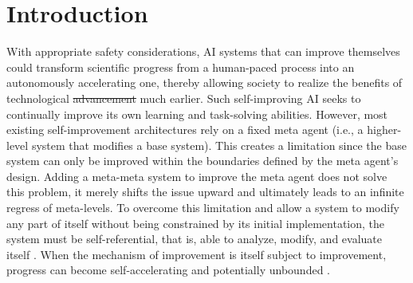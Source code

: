 \documentclass[]{fairmeta}
\title{{\ha}}
\author[1,2\dagger]{Jenny Zhang}
\author[3\dagger]{Bingchen Zhao}
\author[4,6]{Wannan Yang}
\author[6]{Jakob Foerster}
\author[\ddagger]{Minqi Jiang}
\author[7]{Sam Devlin}
\author[6]{Tatiana Shavrina}
\affiliation[1]{University of British Columbia}
\affiliation[2]{Vector Institute}
\affiliation[3]{University of Edinburgh}
\affiliation[5]{Canada CIFAR AI Chair}
\affiliation[6]{FAIR at Meta}
\affiliation[7]{Meta Superintelligence Labs}
\date{\today}
\providecommand{\DIFaddtex}[1]{{\protect\color{blue}\uwave{#1}}} %
\providecommand{\DIFdeltex}[1]{{\protect\color{red}\sout{#1}}}                      %
\providecommand{\DIFaddbegin}{} %
\providecommand{\DIFaddend}{} %
\providecommand{\DIFdelbegin}{} %
\providecommand{\DIFdelend}{} %
\providecommand{\DIFadd}[1]{\texorpdfstring{\DIFaddtex{#1}}{#1}} %
\providecommand{\DIFdel}[1]{\texorpdfstring{\DIFdeltex{#1}}{}} %
\begin{document}
\maketitle

\section{Introduction}
\label{sec:intro}

With appropriate safety considerations, AI systems that can improve themselves could transform scientific progress from a human-paced process into an autonomously accelerating one, thereby allowing society to realize the benefits of technological \DIFdelbegin \DIFdel{advancement }\DIFdelend \DIFaddbegin \DIFadd{advances }\DIFaddend much earlier. Such self-improving AI seeks to continually improve its own learning and task-solving abilities. However, most existing self-improvement architectures rely on a fixed meta agent (i.e., a higher-level system that modifies a base system). This creates a limitation since the base system can only be improved within the boundaries defined by the meta agent's design. Adding a meta-meta system to improve the meta agent does not solve this problem, it merely shifts the issue upward and ultimately leads to an infinite regress of meta-levels. To overcome this limitation and allow a system to modify any part of itself without being constrained by its initial implementation, the system must be self-referential, that is, able to analyze, modify, and evaluate itself \citep{kirsch2022eliminating, zhang2025darwin}. When the mechanism of improvement is itself subject to improvement, progress can become self-accelerating and potentially unbounded \citep{lu2023arbitrary}.
\end{document}
